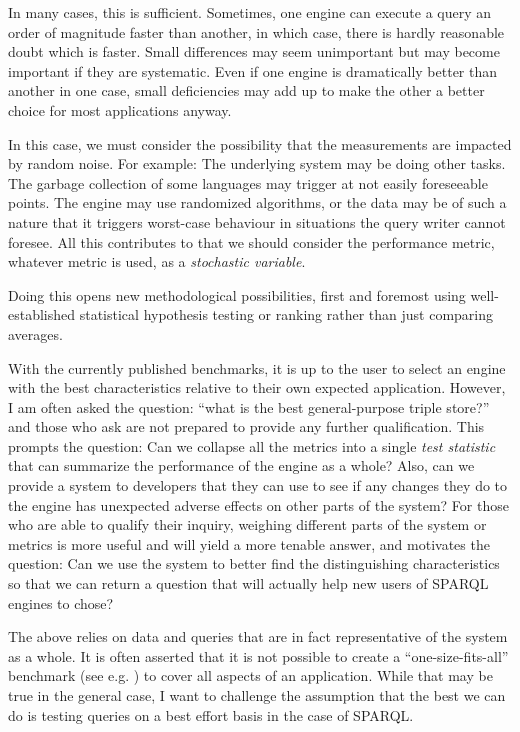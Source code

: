 \documentclass{llncs}
\begin{document}
In many cases, this is sufficient. Sometimes, one engine can execute a
query an order of magnitude faster than another, in which case, there
is hardly reasonable doubt which is faster. Small differences may seem
unimportant but may become important if they are systematic. Even if
one engine is dramatically better than another in one case, small
deficiencies may add up to make the other a better choice for most
applications anyway.

In this case, we must consider the possibility that the measurements
are impacted by random noise. For example: The underlying system may
be doing other tasks. The garbage collection of some languages may
trigger at not easily foreseeable points. The engine may use
randomized algorithms, or the data may be of such a nature that it
triggers worst-case behaviour in situations the query writer cannot
foresee. All this contributes to that we should consider the
performance metric, whatever metric is used, as a \emph{stochastic
  variable}.

Doing this opens new methodological possibilities, first and foremost
using well-established statistical hypothesis testing or ranking
rather than just comparing averages.

With the currently published benchmarks, it is up to the user to
select an engine with the best characteristics relative to their own
expected application. However, I am often asked the question: ``what
is the best general-purpose triple store?'' and those who ask are not
prepared to provide any further qualification. This prompts the
question: Can we collapse all the metrics into a single \emph{test
  statistic} that can summarize the performance of the engine as a
whole? Also, can we provide a system to developers that they can use
to see if any changes they do to the engine has unexpected adverse
effects on other parts of the system? For those who are able to
qualify their inquiry, weighing different parts of the system or
metrics is more useful and will yield a more tenable answer, and
motivates the question: Can we use the system to better find the
distinguishing characteristics so that we can return a question that
will actually help new users of SPARQL engines to chose? 

The above relies on data and queries that are in fact representative
of the system as a whole. It is often asserted that it is not possible
to create a ``one-size-fits-all'' benchmark (see
e.g. \cite{Schmidt:2011:FBS:2063016.2063054}) to cover all aspects of
an application. While that may be true in the general case, I want to
challenge the assumption that the best we can do is testing queries on
a best effort basis in the case of SPARQL.
\end{document}
